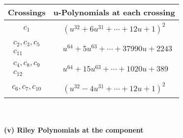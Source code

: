 \documentclass[1p]{elsarticle_modified}
\theoremstyle{definition}
\begin{document}
\begin{tabular}{m{50pt}|m{274pt}}
Crossings & \hspace{64pt}u-Polynomials at each crossing \\
\hline $$\begin{aligned}c_{1}\end{aligned}$$&$\begin{aligned}
&(u^{32}+6 u^{31}+\cdots+12 u+1)^{2}
\end{aligned}$\\
\hline $$\begin{aligned}c_{2},c_{3},c_{5}\\c_{11}\end{aligned}$$&$\begin{aligned}
&u^{64}+5 u^{63}+\cdots+37990 u+2243
\end{aligned}$\\
\hline $$\begin{aligned}c_{4},c_{8},c_{9}\\c_{12}\end{aligned}$$&$\begin{aligned}
&u^{64}+15 u^{63}+\cdots+1020 u+389
\end{aligned}$\\
\hline $$\begin{aligned}c_{6},c_{7},c_{10}\end{aligned}$$&$\begin{aligned}
&(u^{32}-4 u^{31}+\cdots+12 u+1)^{2}
\end{aligned}$\\
\hline
\end{tabular}\\~\\
\newpage\renewcommand{\arraystretch}{1}
\flushleft \textbf{(v) Riley Polynomials at the component}\newline \\
\end{document}
